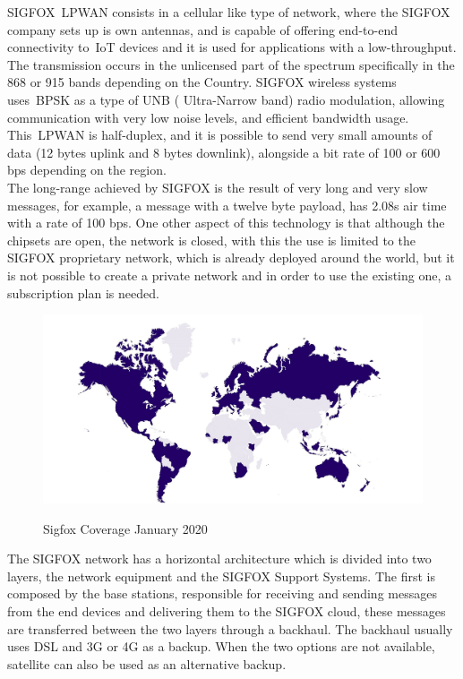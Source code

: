 SIGFOX~\gls{LPWAN} consists in a cellular like type of network, where the SIGFOX company sets up is own antennas, and is capable of offering end-to-end connectivity to~\gls{IoT} devices and it is used  for applications with a low-throughput. The transmission occurs in the unlicensed part of the spectrum specifically in the 868 or 915 bands depending on the Country. SIGFOX wireless systems uses~\gls{BPSK} as a type of UNB ( Ultra-Narrow band) radio modulation, allowing communication with very low noise levels, and efficient bandwidth usage. This~\gls{LPWAN} is half-duplex, and it is possible to send very small amounts of data (12 bytes uplink and 8 bytes downlink), alongside a bit rate of 100 or 600 bps depending on the region. \\The long-range achieved by SIGFOX is the result of very long and very slow messages, for example, a message with a twelve byte payload, has 2.08s air time  with a rate of 100 bps. One other aspect of this technology is that although the chipsets are open, the network is closed, with this the use is limited to the SIGFOX proprietary network, which is already deployed around the world, but it is not possible to create a private network and in order to use the existing one, a subscription plan is needed.\newline
\begin{figure}[htbp]
  \centering
  
    {\includegraphics[width=0.9\linewidth]{Chapters/Figures/coverage-map-jan-20.jpg}}%
 
  \caption{Sigfox Coverage January 2020~\cite{SIGSITE}}
  \label{fig:Sigfox_Coverage}
\end{figure}\newline
The SIGFOX network has a horizontal architecture which is divided into two layers, the network equipment and the SIGFOX Support Systems. The first is composed by the base stations, responsible for receiving and sending messages from the end devices and delivering them to the SIGFOX cloud, these messages are transferred between the two layers through a backhaul. The backhaul usually uses DSL and 3G or 4G as a backup. When the two options are not available, satellite can also be used as an alternative backup. 
